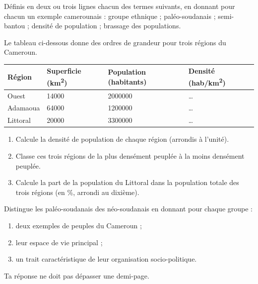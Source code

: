 \documentclass[11pt]{article}
\newcommand{\cle}[1]{{\popxbold\color{popdark}#1}}
\newcounter{popsec}
\newcounter{popsub}
\newcommand{\courssub}[1]{%
  \stepcounter{popsub}%
  \par\vspace{9pt}\noindent{\popxbold\fontsize{11.5}{13}\selectfont\color{popink}{\color{poporange}\thepopsec.\thepopsub}\hspace{6pt}#1}\par\nopagebreak\vspace{4pt}
}
\begin{document}
\begin{exercice}[Définitions]
Définis en deux ou trois lignes chacun des termes suivants, en donnant pour chacun un exemple camerounais : \cle{groupe ethnique} ; \cle{paléo-soudanais} ; \cle{semi-bantou} ; \cle{densité de population} ; \cle{brassage des populations}.
\end{exercice}

\begin{exercice}
Le tableau ci-dessous donne des ordres de grandeur pour trois régions du Cameroun.

\begin{center}
\begin{tabularx}{\linewidth}{|l|X|X|X|}
\hline
\rowcolor{popblueL} Région & Superficie (km\textsuperscript{2}) & Population (habitants) & Densité (hab/km\textsuperscript{2}) \\
\hline
Ouest & \num{14000} & \num{2000000} & \ldots \\
\hline
Adamaoua & \num{64000} & \num{1200000} & \ldots \\
\hline
Littoral & \num{20000} & \num{3300000} & \ldots \\
\hline
\end{tabularx}
\end{center}

\begin{enumerate}
\item Calcule la densité de population de chaque région (arrondis à l'unité).
\item Classe ces trois régions de la plus densément peuplée à la moins densément peuplée.
\item Calcule la part de la population du Littoral dans la population totale des trois régions (en \%, arrondi au dixième).
\end{enumerate}
\end{exercice}

\courssub{Je m'entraîne}

\begin{exercice}
Distingue les \cle{paléo-soudanais} des \cle{néo-soudanais} en donnant pour chaque groupe :
\begin{enumerate}
\item deux exemples de peuples du Cameroun ;
\item leur espace de vie principal ;
\item un trait caractéristique de leur organisation socio-politique.
\end{enumerate}
Ta réponse ne doit pas dépasser une demi-page.
\end{exercice}
\end{document}
